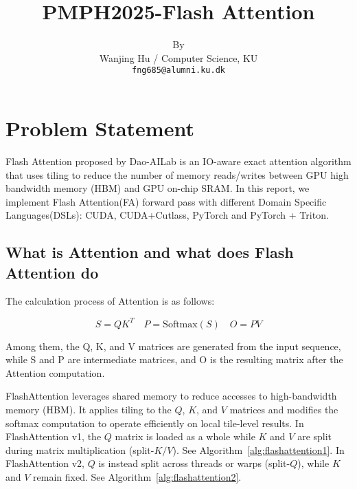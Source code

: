 \documentclass[11pt]{article}
\title{PMPH2025-Flash Attention}
\author{By \\
  Wanjing Hu / Computer Science, KU  \\
  \texttt{fng685@alumni.ku.dk} \\}
\renewcommand\cite{\citep}  %
\begin{document}
\maketitle

\section{Problem Statement}

Flash Attention proposed by Dao-AILab is an IO-aware exact attention algorithm that uses tiling to reduce the number of memory reads/writes between GPU high bandwidth memory (HBM) and GPU on-chip SRAM\cite{dao2022flashattention}. In this report, we implement Flash Attention(FA) forward pass with different Domain Specific Languages(DSLs): CUDA, CUDA+Cutlass, PyTorch and PyTorch + Triton.

\subsection{What is Attention and what does Flash Attention do}
The calculation process of Attention is as follows:

\[
S = QK^{T} \quad P = \text{Softmax}(S) \quad O = PV
\]

Among them, the Q, K, and V matrices are generated from the input sequence, while S and P are intermediate matrices, and O is the resulting matrix after the Attention computation.

FlashAttention leverages shared memory to reduce accesses to high-bandwidth memory (HBM). It applies tiling to the $Q$, $K$, and $V$ matrices and modifies the softmax computation to operate efficiently on local tile-level results. In FlashAttention v1, the $Q$ matrix is loaded as a whole while $K$ and $V$ are split  during matrix multiplication (split-$K/V$). See Algorithm~\ref{alg:flashattention1}. In FlashAttention v2, $Q$ is instead split across threads or warps (split-$Q$), while $K$ and $V$ remain fixed. See Algorithm~\ref{alg:flashattention2}.
\end{document}
